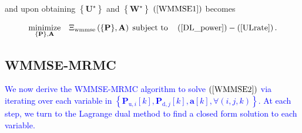 \documentclass[9pt,journal]{IEEEtran}
\newcommand{\paren}[1]{\left({#1}\right)}
\newcommand{\bracket}[1]{{\left [{#1}\right ]}}
\newcommand{\braces}[1]{{\left\{ {#1}\right\}}}
\newcommand{\PiB}{\mathbf{P}_{\textrm{u},i}\bracket{k}}
\newcommand{\PBj}{\mathbf{P}_{\textrm{d},j}\bracket{k}}
\theoremstyle{definition}
\begin{document}
\fi
and upon obtaining $\braces{\mathbf{U}^\star}$ and $\braces{\mathbf{W}^\star}$ $\paren{\ref{WMMSE1}}$ becomes \par\noindent\small
\begin{equation}
\label{WMMSE2}
\underset{{\braces{\mathbf{P}},\mathbf{A}}}{\textrm{minimize}}\quad\Xi_{\textrm{wmmse}}\paren{\braces{\mathbf{P}},\mathbf{A}}\;\textrm{subject to}\quad  \paren{\mathrm{\ref{DL_power}}}-\paren{\mathrm{\ref{ULrate}}}.
\end{equation}\normalsize

\subsection{WMMSE-MRMC} \label{subsec:seq}
\textcolor{blue}{We now derive the WMMSE-MRMC algorithm to solve $\paren{\ref{WMMSE2}}$ via iterating over each variable in $\braces{\PiB,\PBj,\mathbf{a}\bracket{k},\forall \paren{i,j,k}}$. At each step, we turn to the Lagrange dual method to find a closed form solution to each variable.} %
\end{document}
